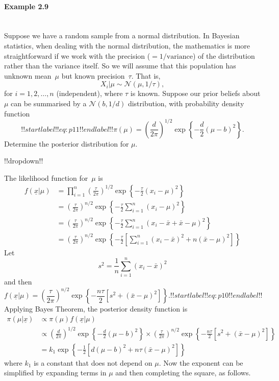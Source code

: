 \paragraph{Example 2.9}{~\\
Suppose we have a random sample from a normal distribution. In Bayesian statistics, when dealing with the normal distribution, the mathematics is more straightforward if we work with the precision ($=1/\mathrm{variance}$) of the distribution rather than the variance itself. So we will assume that this population has unknown mean~$\mu$ but known precision~$\tau$. That is, 
$$X_i|\mu\sim \mathcal{N}(\mu,1/\tau),$$
for $i=1,2,\ldots,n$ (independent), where $\tau$ is known. Suppose our prior beliefs about $\mu$ can be summarised by a $\mathcal{N}(b,1/d)$ distribution, with probability density function
\begin{equation}
!!startlabel!! eq:p11 !!endlabel!!
\pi(\mu)=
\left(\frac{d}{2\pi}\right)^{1/2}\exp\left\{-\frac{d}{2}(\mu-b)^2\right\}.
\end{equation}
Determine the posterior distribution for $\mu$. 





!!dropdown!!

The likelihood function for~$\mu$ is
        \begin{align*}
        f(\underline{x}|\mu)&=\prod_{i=1}^n 
        \left(\frac{\tau}{2\pi}\right)^{1/2}
        \exp\left\{-\frac{\tau}{2}(x_i-\mu)^2\right\}  \\
        &= \left(\frac{\tau}{2\pi}\right)^{n/2}
        \exp\left\{-\frac{\tau}{2}\sum_{i=1}^n (x_i-\mu)^2\right\} \\
        &= \left(\frac{\tau}{2\pi}\right)^{n/2}
        \exp\left\{-\frac{\tau}{2}\sum_{i=1}^n (x_i-\bar x+\bar x-\mu)^2\right\} \\
        &= \left(\frac{\tau}{2\pi}\right)^{n/2}
        \exp\left\{-\frac{\tau}{2}\left[\sum_{i=1}^n (x_i-\bar x)^2+n(\bar x-\mu)^2\right]\right\} 
        \end{align*}
        Let
        $$s^2 =\frac{1}{n}\sum_{i=1}^n (x_i-\bar x)^2$$
        and then
        \begin{equation}
        f(\underline{x} | \mu) = \left(\frac{\tau}{2\pi}\right)^{n/2}
        \exp\left\{-\frac{n\tau}{2}\left[s^2+(\bar x-\mu)^2\right]\right\}. !!startlabel!! eq:p10 !!endlabel!!
        \end{equation}
        Applying Bayes Theorem, the posterior density function is
        \begin{align*}
        \pi(\mu|\underline{x})&\propto\pi(\mu)f(\underline{x} | \mu)\\
        &\propto \left(\frac{d}{2\pi}\right)^{1/2}\exp\left\{-\frac{d}{2}(\mu-b)^2\right\} \times \left(\frac{\tau}{2\pi}\right)^{n/2}
        \exp\left\{-\frac{n\tau}{2}\left[s^2+(\bar x-\mu)^2\right]\right\} \\
        &=k_1\exp\left\{-\frac{1}{2}\left[d(\mu-b)^2+n\tau(\bar x-\mu)^2\right]\right\}
        \end{align*}
        where $k_1$ is a constant that does not depend on $\mu$. Now the
        exponent can be simplified by expanding terms in $\mu$ and then
        completing the square, as follows.
        
}

